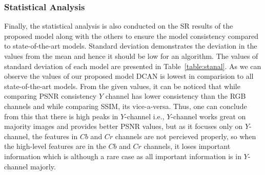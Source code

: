 \documentclass[conference]{IEEEtran}
\begin{document}
\subsubsection*{Statistical Analysis}
Finally, the statistical analysis is also conducted on the SR results of the proposed model along with the others to ensure the model consistency compared to state-of-the-art models. Standard deviation demonstrates the deviation in the values from the mean and hence it should be low for an algorithm. The values of standard deviation of each model are presented in Table~\ref{table:stanal}. As we can observe the values of our proposed model DCAN is lowest in comparision to all state-of-the-art models. From the given values, it can be noticed that while comparing PSNR consistency $Y$ channel has lower consistency than the RGB channels and while comparing SSIM, its vice-a-versa. Thus, one can conclude from this that there is high peaks in $Y$-channel i.e., $Y$-channel works great on majority images and provides better PSNR values, but as it focuses only on $Y$-channel, the features in $Cb$ and $Cr$ channels are not percieved properly, so when the high-level features are in the $Cb$ and $Cr$ channels, it loses important information which is although a rare case as all important information is in $Y$-channel majorly. %
\end{document}
